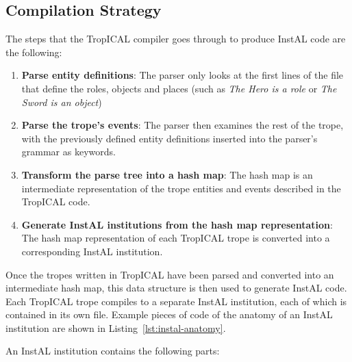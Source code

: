 \documentclass[11pt]{report}
\begin{document}
\subsection{Compilation Strategy}

The steps that the TropICAL compiler goes through to produce InstAL code are the
following:

\begin{enumerate}
\item \textbf{Parse entity definitions}: The parser only looks at the first
  lines of the file that define the roles, objects and places (such as \emph{The
    Hero is a role} or \emph{The Sword is an object})
\item \textbf{Parse the trope's events}: The parser then examines the rest of
  the trope, with the previously defined entity definitions inserted into the
  parser's grammar as keywords.
\item \textbf{Transform the parse tree into a hash map}: The hash map is an
  intermediate representation of the trope entities and events described in the
  TropICAL code.
\item \textbf{Generate InstAL institutions from the hash map representation}:
  The hash map representation of each TropICAL trope is converted into a corresponding InstAL institution.
\end{enumerate}

Once the tropes written in TropICAL have been parsed and converted into an
intermediate hash map, this data structure is then used to generate InstAL code.
Each TropICAL trope compiles to a separate InstAL institution, each of which is
contained in its own file. Example pieces of code of the anatomy of an InstAL institution are
shown in Listing~\ref{lst:instal-anatomy}. 

An InstAL institution contains the following parts:
\end{document}
